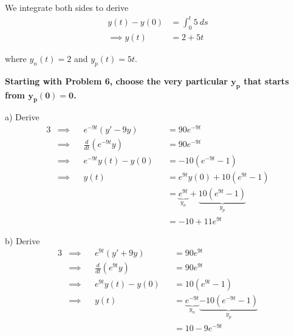 \documentclass[a4paper]{article}
\begin{document}
We integrate both sides to derive
\begin{align*}
	y \!\left( t \right) - y \!\left( 0 \right)  & = \int^{t}_{0} 5  \ ds  \\
	\implies y \!\left( t \right)  & = 2 + 5t 
\end{align*}

where \(y_{n} \!\left( t \right) = 2\) and \(y_{p} \!\left( t \right) = 5t\).

\vspace{12pt}

\textbf{Starting with Problem 6, choose the very particular \(\bm{y_{p}}\) that starts from \(\bm{y_{p} \!\left( 0 \right) = 0}\).}


a) Derive
\begin{alignat*}{3}
	&\implies && e^{-9t} \!\left( y' - 9y \right) && = 90e^{-9t} \\
	&\implies && \frac{d }{d t} \!\left( e^{-9t}y \right) && = 90e^{-9t} \\ 
	&\implies && e^{-9t} y \!\left( t \right) - y \!\left( 0 \right) && = -10 \!\left( e^{-9t} - 1 \right) \\
	&\implies && y \!\left( t \right) && = e^{9t} y \!\left( 0 \right) + 10 \!\left( e^{9t} - 1 \right) \\
	& && && = \underbrace{e^{9t}}_{y_{n}} + \underbrace{10 \!\left( e^{9t} - 1 \right)}_{y_{p}} \\
	& && && = -10 + 11e^{9t}
\end{alignat*}

b) Derive
\begin{alignat*}{3}
	&\implies && e^{9t} \!\left( y' + 9y \right) && = 90e^{9t} \\
	&\implies && \frac{d }{d t} \!\left( e^{9t}y \right) && = 90e^{9t} \\ 
	&\implies && e^{9t}y \!\left( t \right) - y \!\left( 0 \right) && = 10 \!\left( e^{9t} - 1 \right) \\
	&\implies && y \!\left( t \right) && = \underbrace{e^{-9t}}_{y_{n}} \underbrace{- 10 \!\left( e^{-9t} - 1 \right) }_{y_{p}} \\
	& && && = 10 - 9e^{-9t}
\end{alignat*}
\end{document}
